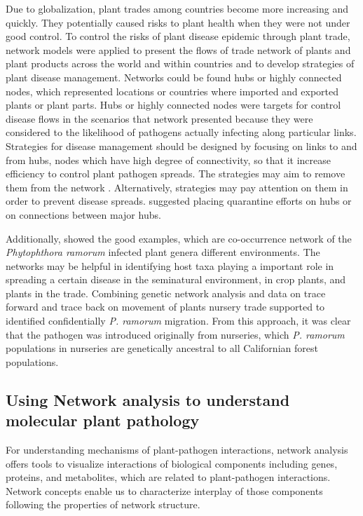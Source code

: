 Due to globalization, plant trades among countries become more increasing and quickly. They potentially caused risks to plant health when they were not under good control. To control the risks of plant disease epidemic through plant trade, network models were applied to present the flows of trade network of plants and plant products across the world and within countries and to develop strategies of plant disease management. Networks could be found hubs or highly connected nodes, which represented locations or countries where imported and exported plants or plant parts. Hubs or highly connected nodes were targets for control disease flows in the scenarios that network presented because they were considered to the likelihood of pathogens actually infecting along particular links. Strategies for disease management should be designed by focusing on links to and from hubs, nodes which have high degree of connectivity, so that it increase efficiency to control plant pathogen spreads. The strategies may aim to remove them from the network . Alternatively, strategies may pay attention on them in order to prevent disease spreads.  suggested placing quarantine efforts on hubs or on connections between major hubs.

Additionally,  showed the good examples, which are co-occurrence network of the \textit{Phytophthora ramorum} infected plant genera different environments. The networks may be helpful in identifying host taxa playing a important role in spreading a certain disease in the seminatural environment, in crop plants, and plants in the trade. Combining genetic network analysis and data on trace forward and trace back on movement of plants nursery trade supported to identified confidentially \textit{P. ramorum} migration. From this approach, it was clear that the pathogen was introduced originally from nurseries, which \textit{P. ramorum} populations in nurseries are genetically ancestral to all Californian forest populations.

\subsection*{Using Network analysis to understand molecular plant pathology}

For understanding mechanisms of plant-pathogen interactions, network analysis offers tools to visualize interactions of biological components including genes, proteins, and metabolites, which are related to plant-pathogen interactions.  Network concepts enable us to characterize interplay of those components following the properties of network structure.  


